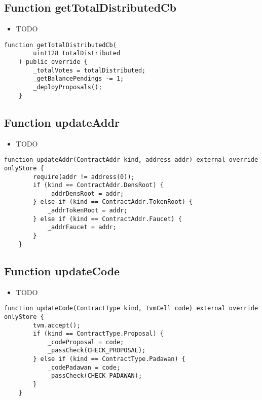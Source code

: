 \subsection{Function getTotalDistributedCb}

\begin{itemize}
\item TODO
\end{itemize}

\begin{lstlisting}[firstnumber=148]
    function getTotalDistributedCb(
        uint128 totalDistributed
    ) public override {
        _totalVotes = totalDistributed;
        _getBalancePendings -= 1;
        _deployProposals();
    }
\end{lstlisting}

\subsection{Function updateAddr}

\begin{itemize}
\item TODO
\end{itemize}

\begin{lstlisting}[firstnumber=174]
    function updateAddr(ContractAddr kind, address addr) external override onlyStore {
        require(addr != address(0));
        if (kind == ContractAddr.DensRoot) {
            _addrDensRoot = addr;
        } else if (kind == ContractAddr.TokenRoot) {
            _addrTokenRoot = addr;
        } else if (kind == ContractAddr.Faucet) {
            _addrFaucet = addr;
        }
    }
\end{lstlisting}

\subsection{Function updateCode}

\begin{itemize}
\item TODO
\end{itemize}

\begin{lstlisting}[firstnumber=185]
    function updateCode(ContractType kind, TvmCell code) external override onlyStore {
        tvm.accept();
        if (kind == ContractType.Proposal) {
            _codeProposal = code;
            _passCheck(CHECK_PROPOSAL);
        } else if (kind == ContractType.Padawan) {
            _codePadawan = code;
            _passCheck(CHECK_PADAWAN);
        }
    }
\end{lstlisting}

